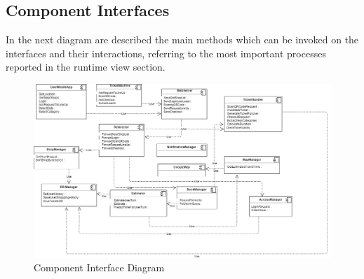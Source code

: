 \clearpage

\subsection{Component Interfaces}
In the next diagram are described the main methods which can be invoked on the interfaces and their interactions, referring to the most important processes reported in the runtime view section.
\vspace{2cm}
\begin{figure}[H]
  \centering
  \includegraphics[width=1.1\textwidth, keepaspectratio]{images/Component Interfaces.png}
  \caption{Component Interface Diagram}
\end{figure}
\vspace{2cm}
